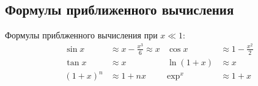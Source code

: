 \subsection{Формулы приближенного вычисления}
Формулы приблженного вычисления при $x \ll 1$:
\begin{align*}
\sin x &\approx x - \frac{x^3}{6} \approx x & \cos x &\approx 1 - \frac{x^2}{2} \\
\tan x &\approx x & \ln(1+x) &\approx x \\
(1 + x)^n &\approx 1 + nx & \exp^x &\approx 1 + x 
\end{align*}